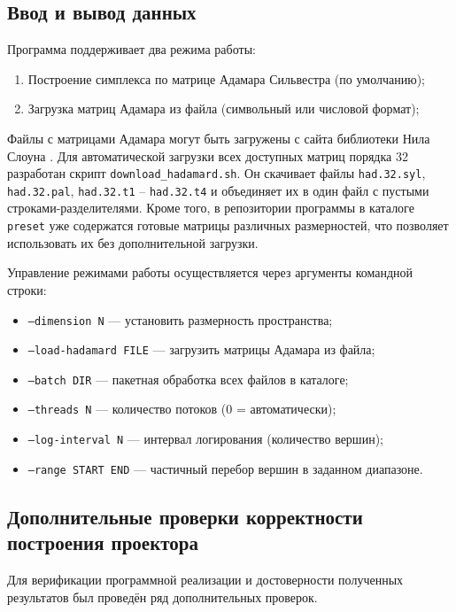 \documentclass[a4paper,12pt]{article}
\theoremstyle{indented}
\begin{document}
\subsection{Ввод и вывод данных}

Программа поддерживает два режима работы:
\begin{enumerate}
    \item Построение симплекса по матрице Адамара Сильвестра (по умолчанию);
    \item Загрузка матриц Адамара из файла (символьный или числовой формат);
\end{enumerate}

Файлы с матрицами Адамара могут быть загружены с сайта библиотеки Нила Слоуна \cite{sloane_hadamard}. Для автоматической загрузки всех доступных матриц порядка 32 разработан скрипт \texttt{download\_hadamard.sh}. Он скачивает файлы \texttt{had.32.syl}, \texttt{had.32.pal}, \texttt{had.32.t1} – \texttt{had.32.t4} и объединяет их в один файл с пустыми строками-разделителями. Кроме того, в репозитории программы в каталоге \texttt{preset} уже содержатся готовые матрицы различных размерностей, что позволяет использовать их без дополнительной загрузки.

Управление режимами работы осуществляется через аргументы командной строки:
\begin{itemize}
    \item \texttt{--dimension N} — установить размерность пространства;
    \item \texttt{--load-hadamard FILE} — загрузить матрицы Адамара из файла;
    \item \texttt{--batch DIR} — пакетная обработка всех файлов в каталоге;
    \item \texttt{--threads N} — количество потоков (0 = автоматически);
    \item \texttt{--log-interval N} — интервал логирования (количество вершин);
    \item \texttt{--range START END} — частичный перебор вершин в заданном диапазоне.
\end{itemize}


\subsection{Дополнительные проверки корректности построения проектора}

Для верификации программной реализации и достоверности полученных результатов был проведён ряд дополнительных проверок.
\end{document}
